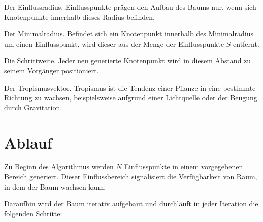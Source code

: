 \begin{description}[labelindent]
	\item[\boldmath$d_i$] Der Einflussradius. Einflusspunkte prägen den Aufbau des Baums nur, wenn sich Knotenpunkte innerhalb dieses Radius befinden. \cite[Abschn. 2]{SpaceColonizationAlgorithm:07}\\
	
	\item[\boldmath$d_k$] Der Minimalradius. Befindet sich ein Knotenpunkt innerhalb des Minimalradius um einen Einflusspunkt, wird dieser aus der Menge der Einflusspunkte $S$ entfernt. \cite[Abschn. 2]{SpaceColonizationAlgorithm:07}\\
	
	\item[\boldmath$D$] Die Schrittweite. Jeder neu generierte Knotenpunkt wird in diesem Abstand zu seinem Vorgänger positioniert. \cite[Abschn. 2]{SpaceColonizationAlgorithm:07} \\
	
	\item[\boldmath$\overrightarrow{T}$] Der Tropismusvektor. Tropismus ist die Tendenz einer Pflanze in eine bestimmte Richtung zu wachsen, beispielsweise aufgrund einer Lichtquelle oder der Beugung durch Gravitation.\cite[Abschn. 3]{SpaceColonizationAlgorithm:07} 

\end{description}

\section{Ablauf}
\label{sec:SCA_Ablauf}
Zu Beginn des Algorithmus werden $N$ Einflusspunkte in einem vorgegebenen Bereich generiert. Dieser Einflussbereich signalisiert die Verfügbarkeit von Raum, in dem der Baum wachsen kann.  \cite[Abschn. 2]{SpaceColonizationAlgorithm:07}

Daraufhin wird der Baum iterativ aufgebaut und durchläuft in jeder Iteration die folgenden Schritte: 

